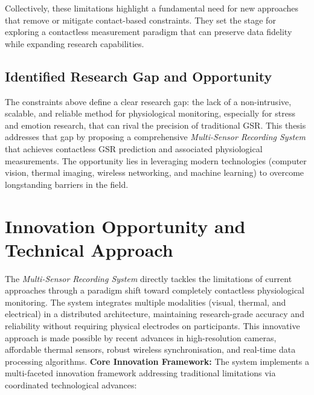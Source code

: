\documentclass[11pt,a4paper]{report}
\begin{document}
Collectively, these limitations highlight a fundamental need for new approaches that remove or mitigate contact-based constraints. They set the stage for exploring a contactless measurement paradigm that can preserve data fidelity while expanding research capabilities. \subsection{Identified Research Gap and Opportunity}
The constraints above define a clear research gap: the lack of a non-intrusive, scalable, and reliable method for physiological monitoring, especially for stress and emotion research, that can rival the precision of traditional GSR. This thesis addresses that gap by proposing a comprehensive \textit{Multi-Sensor Recording System} that achieves contactless GSR prediction and associated physiological measurements. The opportunity lies in leveraging modern technologies (computer vision, thermal imaging, wireless networking, and machine learning) to overcome longstanding barriers in the field. \section{Innovation Opportunity and Technical Approach}
The \textit{Multi-Sensor Recording System} directly tackles the limitations of current approaches through a paradigm shift toward completely contactless physiological monitoring. The system integrates multiple modalities (visual, thermal, and electrical) in a distributed architecture, maintaining research-grade accuracy and reliability without requiring physical electrodes on participants. This innovative approach is made possible by recent advances in high-resolution cameras, affordable thermal sensors, robust wireless synchronisation, and real-time data processing algorithms. \textbf{Core Innovation Framework:} The system implements a multi-faceted innovation framework addressing traditional limitations via coordinated technological advances:
\end{document}
